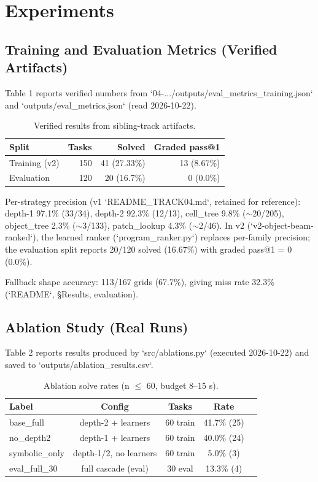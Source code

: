\documentclass[11pt,a4paper]{article}
\begin{document}
\section{Experiments}

\subsection{Training and Evaluation Metrics (Verified Artifacts)}

Table 1 reports verified numbers from `04-.../outputs/eval_metrics_training.json` and `outputs/eval_metrics.json` (read 2026-10-22).

\begin{table}[h]
\centering
\caption{Verified results from sibling-track artifacts.}
\label{tab:results}
\begin{tabular}{lrrr}
\toprule
Split & Tasks & Solved & Graded pass@1 \\
\midrule
Training (v2) & 150 & 41 (27.33\%) & 13 (8.67\%) \\
Evaluation & 120 & 20 (16.7\%) & 0 (0.0\%) \\
\bottomrule
\end{tabular}
\end{table}

Per-strategy precision (v1 `README_TRACK04.md`, retained for reference): depth-1 97.1\% (33/34), depth-2 92.3\% (12/13), cell_tree 9.8\% ($\sim$20/205), object_tree 2.3\% ($\sim$3/133), patch_lookup 4.3\% ($\sim$2/46). In v2 (`v2-object-beam-ranked`), the learned ranker (`program_ranker.py`) replaces per-family precision; the evaluation split reports 20/120 solved (16.67\%) with graded pass@1 = 0 (0.0\%).

Fallback shape accuracy: 113/167 grids (67.7\%), giving miss rate 32.3\% (`README`, §Results, evaluation).

\subsection{Ablation Study (Real Runs)}

Table 2 reports results produced by `src/ablations.py` (executed 2026-10-22) and saved to `outputs/ablation_results.csv`.

\begin{table}[h]
\centering
\caption{Ablation solve rates (n $\le$ 60, budget 8--15 s).}
\label{tab:ablation}
\begin{tabular}{lcccc}
\toprule
Label & Config & Tasks & Rate \\
\midrule
base\_full & depth-2 + learners & 60 train & 41.7\% (25) \\
no\_depth2 & depth-1 + learners & 60 train & 40.0\% (24) \\
symbolic\_only & depth-1/2, no learners & 60 train & 5.0\% (3) \\
eval\_full\_30 & full cascade (eval) & 30 eval & 13.3\% (4) \\
\bottomrule
\end{tabular}
\end{table}
\end{document}
